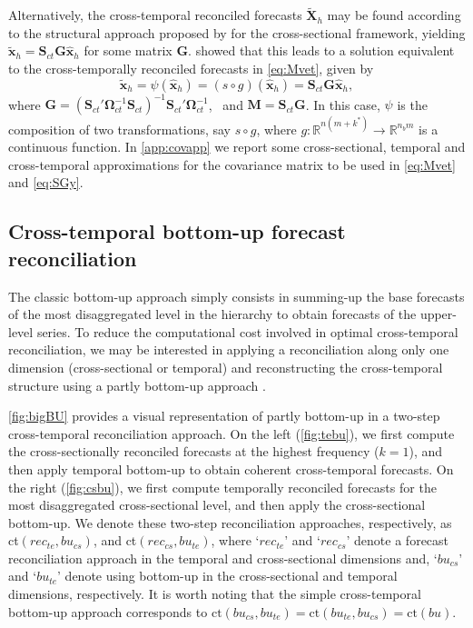 \documentclass[12pt]{article}
\newcommand{\xvet}{\bm{x}}
\newcommand{\Gvet}{\bm{G}}
\newcommand{\Mvet}{\bm{M}}
\newcommand{\Svet}{\bm{S}}
\newcommand{\Xvet}{\bm{X}}
\newcommand{\Omegavet}{\bm{\Omega}}
\theoremstyle{definition}
\begin{document}
Alternatively, the cross-temporal reconciled forecasts $\widetilde{\Xvet}_{h}$ may be found according to the structural approach proposed by \cite{hyndman2011} for the cross-sectional framework, yielding $\widetilde{\xvet}_h = \Svet_{ct}\Gvet \widehat{\xvet}_h$ for some matrix $\Gvet$. \citet{wickramasuriya2019} showed that this leads to a solution equivalent to the cross-temporally reconciled forecasts in \eqref{eq:Mvet}, given by
\begin{equation}\label{eq:SGy}
	\widetilde{\xvet}_{h} = \psi\left(\widehat{\xvet}_h \right) = \left(s \circ g \right)\left(\widehat{\xvet}_h\right)=\Svet_{ct}\Gvet \widehat{\xvet}_{h},
\end{equation}
where $\Gvet = (\Svet_{ct}' \Omegavet_{ct}^{-1}\Svet_{ct})^{-1} \Svet_{ct}'\Omegavet_{ct}^{-1}$,~ and $\Mvet = \Svet_{ct} \Gvet$. In this case, $\psi$ is the composition of two transformations, say $s \circ g$, where $g: \mathbb{R}^{n(m+k^\ast)} \rightarrow \mathbb{R}^{n_b m}$ is a continuous function. In \autoref{app:covapp} we report some cross-sectional, temporal and cross-temporal approximations for the covariance matrix to be used in \eqref{eq:Mvet} and \eqref{eq:SGy}.

\subsection{Cross-temporal bottom-up forecast reconciliation}\label{ssec:ctbu}

The classic bottom-up approach \citep{dunn1976, dangerfield1992} simply consists in summing-up the base forecasts of the most disaggregated level in the hierarchy to obtain forecasts of the upper-level series. To reduce the computational cost involved in optimal cross-temporal reconciliation, we may be interested in applying a reconciliation along only one dimension (cross-sectional or temporal) and reconstructing the cross-temporal structure using a partly bottom-up approach \citep{difonzo2022b, difonzo2023a, sanguri2022}.

\autoref{fig:bigBU} provides a visual representation of partly bottom-up in a two-step cross-temporal reconciliation approach. On the left (\autoref{fig:tebu}), we first compute the cross-sectionally reconciled forecasts at the highest frequency ($k = 1$), and then apply temporal bottom-up to obtain coherent cross-temporal forecasts. On the right (\autoref{fig:csbu}), we first compute temporally reconciled forecasts for the most disaggregated cross-sectional level, and then apply the cross-sectional bottom-up. We denote these two-step reconciliation approaches, respectively, as ct$(rec_{te},bu_{cs})$, and ct$(rec_{cs},bu_{te})$, where ‘$rec_{te}$’ and ‘$rec_{cs}$’ denote a forecast reconciliation approach in the temporal and cross-sectional dimensions and, ‘$bu_{cs}$’ and ‘$bu_{te}$’ denote using bottom-up in the cross-sectional and temporal dimensions, respectively. It is worth noting that the simple cross-temporal bottom-up approach corresponds to $\mathrm{ct}(bu_{cs}, bu_{te})=\mathrm{ct}(bu_{te}, bu_{cs})=\mathrm{ct}(bu)$.
\end{document}
